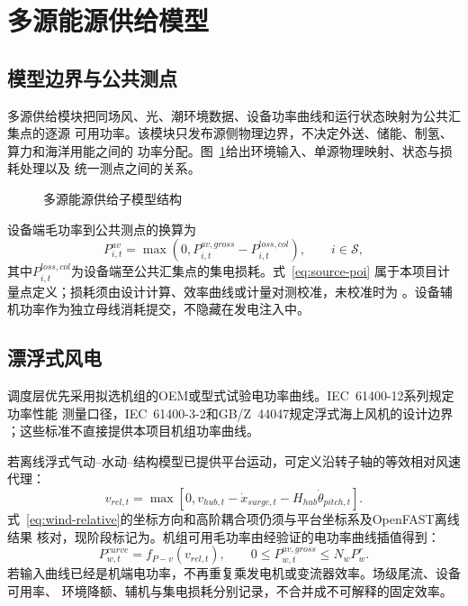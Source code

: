 \section{多源能源供给模型}
\label{sec:renewables-load}

\subsection{模型边界与公共测点}

多源供给模块把同场风、光、潮环境数据、设备功率曲线和运行状态映射为公共汇集点的逐源
可用功率。该模块只发布源侧物理边界，不决定外送、储能、制氢、算力和海洋用能之间的
功率分配。图~\ref{fig:source-model}给出环境输入、单源物理映射、状态与损耗处理以及
统一测点之间的关系。
\begin{figure}[H]
\centering
\resizebox{0.96\textwidth}{!}{}
\caption{多源能源供给子模型结构}
\label{fig:source-model}
\end{figure}

设备端毛功率到公共测点的换算为
\begin{equation}
P_{i,t}^{av}=\max\!\left(0,
P_{i,t}^{av,gross}-P_{i,t}^{loss,col}\right),
\qquad i\in\mathcal S,
\label{eq:source-poi}
\end{equation}
其中$P_{i,t}^{loss,col}$为设备端至公共汇集点的集电损耗。式~\eqref{eq:source-poi}
属于本项目计量点定义；损耗须由设计计算、效率曲线或计量对测校准，未校准时为
\assumptiontag。设备辅机功率作为独立母线消耗提交，不隐藏在发电注入中。

\subsection{漂浮式风电}

调度层优先采用拟选机组的OEM或型式试验电功率曲线。IEC~61400-12系列规定功率性能
测量口径，IEC~61400-3-2和GB/Z~44047规定浮式海上风机的设计边界
\cite{iec61400-12,iec61400-3-2,gbz44047}；这些标准不直接提供本项目机组功率曲线。

若离线浮式气动--水动--结构模型已提供平台运动，可定义沿转子轴的等效相对风速代理：
\begin{equation}
v_{rel,t}=\max\!\left[0,
v_{hub,t}-\dot x_{surge,t}-H_{hub}\dot\theta_{pitch,t}\right].
\label{eq:wind-relative}
\end{equation}
式~\eqref{eq:wind-relative}的坐标方向和高阶耦合项仍须与平台坐标系及OpenFAST离线结果
核对，现阶段标记为\verifytag。机组可用毛功率由经验证的电功率曲线插值得到：
\begin{equation}
P_{w,t}^{curve}=f_{P-v}(v_{rel,t}),\qquad
0\le P_{w,t}^{av,gross}\le N_wP_w^r.
\label{eq:wind-curve}
\end{equation}
若输入曲线已经是机端电功率，不再重复乘发电机或变流器效率。场级尾流、设备可用率、
环境降额、辅机与集电损耗分别记录，不合并成不可解释的固定效率。

